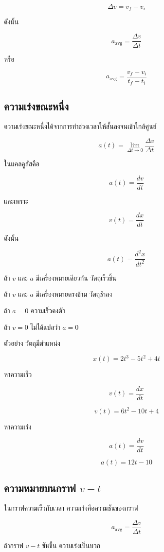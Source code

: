 \[
\Delta v=v_f-v_i
\]

ดังนั้น

\[
a_{\text{avg}}=\frac{\Delta v}{\Delta t}
\]

หรือ

\[
a_{\text{avg}}=\frac{v_f-v_i}{t_f-t_i}
\]

\subsection{ความเร่งขณะหนึ่ง}

ความเร่งขณะหนึ่งได้จากการทำช่วงเวลาให้สั้นลงจนเข้าใกล้ศูนย์

\[
a(t)=\lim_{\Delta t\to 0}\frac{\Delta v}{\Delta t}
\]

ในแคลคูลัสคือ

\[
a(t)=\frac{dv}{dt}
\]

และเพราะ

\[
v(t)=\frac{dx}{dt}
\]

ดังนั้น

\[
a(t)=\frac{d^2x}{dt^2}
\]

\begin{tcolorbox}[title=กฎจำง่าย]
ถ้า $v$ และ $a$ มีเครื่องหมายเดียวกัน วัตถุเร็วขึ้น

ถ้า $v$ และ $a$ มีเครื่องหมายตรงข้าม วัตถุช้าลง

ถ้า $a=0$ ความเร็วคงตัว

ถ้า $v=0$ ไม่ได้แปลว่า $a=0$
\end{tcolorbox}

\begin{examplebox}{ตัวอย่าง}
วัตถุมีตำแหน่ง

\[
x(t)=2t^3-5t^2+4t
\]

หาความเร็ว

\[
v(t)=\frac{dx}{dt}
\]

\[
v(t)=6t^2-10t+4
\]

หาความเร่ง

\[
a(t)=\frac{dv}{dt}
\]

\[
a(t)=12t-10
\]
\end{examplebox}

\subsection{ความหมายบนกราฟ $v-t$}

ในกราฟความเร็วกับเวลา ความเร่งคือความชันของกราฟ

\[
a_{\text{avg}}=\frac{\Delta v}{\Delta t}
\]

ถ้ากราฟ $v-t$ ชันขึ้น ความเร่งเป็นบวก

